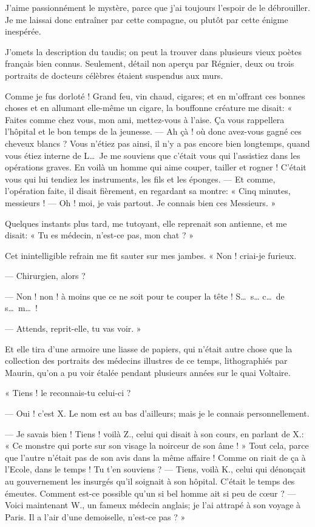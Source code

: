 J’aime passionnément le mystère, parce que
j’ai toujours l’espoir de le
débrouiller. Je me laissai donc entraîner par cette compagne, ou plutôt
par cette énigme inespérée.

J’omets la description du taudis; on peut la trouver
dans plusieurs vieux poètes français bien connus. Seulement, détail non
aperçu par Régnier, deux ou trois portraits de docteurs célèbres
étaient suspendus aux murs.

Comme je fus dorloté ! Grand feu, vin chaud, cigares; et en
m’offrant ces bonnes choses et en allumant elle{}-même
un cigare, la bouffonne créature me disait: « Faites comme chez vous,
mon ami, mettez{}-vous à l’aise. Ça vous rappellera
l’hôpital et le bon temps de la jeunesse. --- Ah çà ! où
donc avez{}-vous gagné ces cheveux blancs ? Vous
n’étiez pas ainsi, il n’y a pas
encore bien longtemps, quand vous étiez interne de L\ldots\ Je me souviens
que c’était vous qui l’assistiez dans
les opérations graves. En voilà un homme qui aime couper, tailler et
rogner ! C’était vous qui lui tendiez les instruments,
les fils et les éponges. --- Et comme, l’opération
faite, il disait fièrement, en regardant sa montre: « Cinq minutes,
messieurs ! --- Oh ! moi, je vais partout. Je connais bien ces Messieurs.
»

Quelques instants plus tard, me tutoyant, elle reprenait son antienne,
et me disait: « Tu es médecin, n’est{}-ce pas, mon
chat ? »

Cet inintelligible refrain me fit sauter sur mes jambes. « Non !
criai{}-je furieux.

--- Chirurgien, alors ?

--- Non ! non ! à moins que ce ne soit pour te couper la tête ! S\ldots\ s\ldots
c\ldots\ de s\ldots\ m\ldots\ !

--- Attends, reprit{}-elle, tu vas voir. »

Et elle tira d’une armoire une liasse de papiers, qui
n’était autre chose que la collection des portraits
des médecins illustres de ce temps, lithographiés par Maurin,
qu’on a pu voir étalée pendant plusieurs années sur le
quai Voltaire.

« Tiens ! le reconnais{}-tu celui{}-ci ?

--- Oui ! c’est X. Le nom est au bas
d’ailleurs; mais je le connais personnellement.

--- Je savais bien ! Tiens ! voilà Z., celui qui disait à son cours, en
parlant de X.: « Ce monstre qui porte sur son visage la noirceur de son
âme ! » Tout cela, parce que l’autre
n’était pas de son avis dans la même affaire ! Comme
on riait de ça à l’Ecole, dans le temps ! Tu
t’en souviens ? --- Tiens, voilà K., celui qui dénonçait
au gouvernement les insurgés qu’il soignait à son
hôpital. C’était le temps des émeutes. Comment
est{}-ce possible qu’un si bel homme ait si peu de
c\oe ur ? --- Voici maintenant W., un fameux médecin anglais; je
l’ai attrapé à son voyage à Paris. Il a
l’air d’une demoiselle,
n’est{}-ce pas ? »

